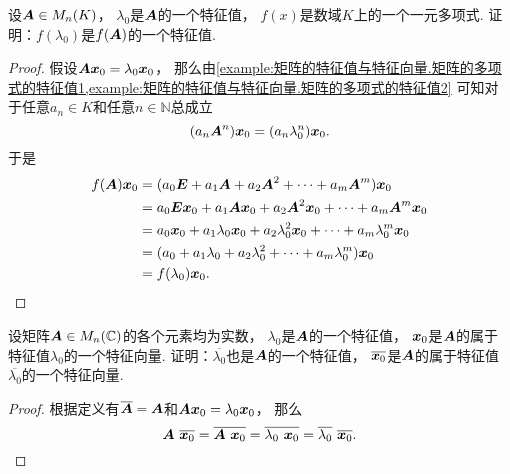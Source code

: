 \begin{example}\label{example:矩阵的特征值与特征向量.矩阵的多项式的特征值4}
设\(\boldsymbol{A} \in M_n(K)\)，
\(\lambda_0\)是\(\boldsymbol{A}\)的一个特征值，
\(f(x)\)是数域\(K\)上的一个一元多项式.
证明：\(f(\lambda_0)\)是\(f(\boldsymbol{A})\)的一个特征值.
\begin{proof}
假设\(\boldsymbol{A} \boldsymbol{x}_0 = \lambda_0 \boldsymbol{x}_0\)，
那么由\cref{example:矩阵的特征值与特征向量.矩阵的多项式的特征值1,example:矩阵的特征值与特征向量.矩阵的多项式的特征值2}
可知对于任意\(a_n \in K\)和任意\(n\in\mathbb{N}\)总成立\begin{equation*}
	(a_n \boldsymbol{A}^n) \boldsymbol{x}_0
	= (a_n \lambda_0^n) \boldsymbol{x}_0.
\end{equation*}
于是\begin{align*}
	f(\boldsymbol{A}) \boldsymbol{x}_0
	&= (a_0 \boldsymbol{E} + a_1 \boldsymbol{A} + a_2 \boldsymbol{A}^2 + \dotsb + a_m \boldsymbol{A}^m) \boldsymbol{x}_0 \\
	&= a_0 \boldsymbol{E} \boldsymbol{x}_0 + a_1 \boldsymbol{A} \boldsymbol{x}_0 + a_2 \boldsymbol{A}^2 \boldsymbol{x}_0 + \dotsb + a_m \boldsymbol{A}^m \boldsymbol{x}_0 \\
	&= a_0 \boldsymbol{x}_0 + a_1 \lambda_0 \boldsymbol{x}_0 + a_2 \lambda_0^2 \boldsymbol{x}_0 + \dotsb + a_m \lambda_0^m \boldsymbol{x}_0 \\
	&= (a_0 + a_1 \lambda_0 + a_2 \lambda_0^2 + \dotsb + a_m \lambda_0^m) \boldsymbol{x}_0 \\
	&= f(\lambda_0) \boldsymbol{x}_0.
	\qedhere
\end{align*}
\end{proof}
\end{example}
\begin{example}
设矩阵\(\boldsymbol{A} \in M_n(\mathbb{C})\)的各个元素均为实数，
\(\lambda_0\)是\(\boldsymbol{A}\)的一个特征值，
\(\boldsymbol{x}_0\)是\(\boldsymbol{A}\)的属于特征值\(\lambda_0\)的一个特征向量.
证明：\(\overline{\lambda_0}\)也是\(\boldsymbol{A}\)的一个特征值，
\(\overline{\boldsymbol{x}_0}\)是\(\boldsymbol{A}\)的属于特征值\(\overline{\lambda_0}\)的一个特征向量.
\begin{proof}
根据定义有\(\overline{\boldsymbol{A}} = \boldsymbol{A}\)和\(\boldsymbol{A} \boldsymbol{x}_0 = \lambda_0 \boldsymbol{x}_0\)，
那么\begin{equation*}
	\boldsymbol{A}~\overline{\boldsymbol{x}_0}
	= \overline{\boldsymbol{A}~\boldsymbol{x}_0}
	= \overline{\lambda_0~\boldsymbol{x}_0}
	= \overline{\lambda_0}~\overline{\boldsymbol{x}_0}.
	\qedhere
\end{equation*}
\end{proof}
\end{example}

